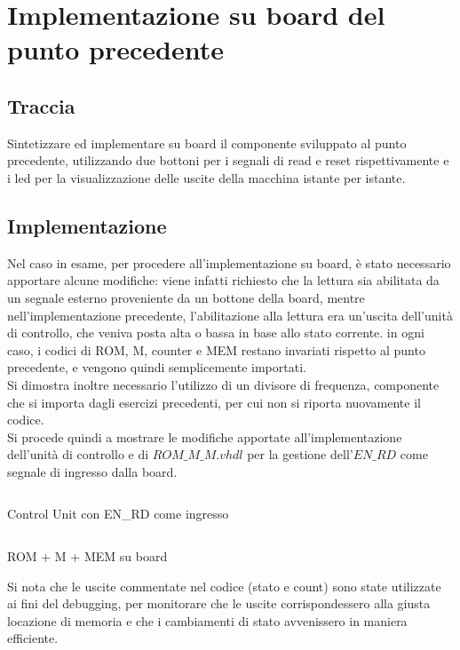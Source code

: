 \section{Implementazione su board del punto precedente}
\subsection{Traccia}
Sintetizzare ed implementare su board il componente sviluppato al punto 
precedente, utilizzando due bottoni per i segnali di read e reset rispettivamente e i 
led per la visualizzazione delle uscite della macchina istante per istante.
\subsection{Implementazione}
Nel caso in esame, per procedere all'implementazione su board, è stato necessario apportare alcune modifiche: viene infatti richiesto che la lettura sia abilitata da un segnale esterno proveniente da un bottone della board, mentre nell'implementazione precedente, l'abilitazione alla lettura era un'uscita dell'unità di controllo, che veniva posta alta o bassa in base allo stato corrente. in ogni caso, i codici di ROM, M, counter e MEM restano invariati rispetto al punto precedente, e vengono quindi semplicemente importati.\\
Si dimostra inoltre necessario l'utilizzo di un divisore di frequenza, componente che si importa dagli esercizi precedenti, per cui non si riporta nuovamente il codice.\\
Si procede quindi a mostrare le modifiche apportate all'implementazione dell'unità di controllo e di $ROM\_M\_M.vhdl$ per la gestione dell'$EN\_RD$ come segnale di ingresso dalla board.
\begin{code}
    \inputminted[frame=lines, framesep=2mm, baselinestretch=1.2, bgcolor=LightGray, fontsize=\footnotesize, linenos]{vhdl}{vhdl_files/ROM_M_MEM_board/control_unit.vhd}
    \caption{Control Unit con EN\_RD come ingresso}
    \label{lbl:ROMC}
\end{code}
\begin{code}
    \inputminted[frame=lines, framesep=2mm, baselinestretch=1.2, bgcolor=LightGray, fontsize=\footnotesize, linenos]{vhdl}{vhdl_files/ROM_M_MEM_board/Rom_M_MEM.vhd}
    \caption{ROM + M + MEM su board}
    \label{lbl:ROMC}
\end{code}
Si nota che le uscite commentate nel codice (stato e count) sono state utilizzate ai fini del debugging, per monitorare che le uscite corrispondessero alla giusta locazione di memoria e che i cambiamenti di stato avvenissero in maniera efficiente.\\
